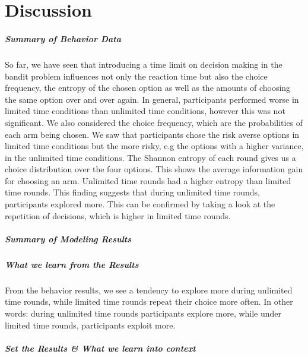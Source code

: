 
\chapter{Discussion}\label{ch:discussion}
\paragraph{Summary of Behavior Data}
So far, we have seen that introducing a time limit on decision making in the bandit problem influences not only the reaction time but also the choice frequency, the entropy of the chosen option as well as the amounts of choosing the same option over and over again. 
In general, participants performed worse in limited time conditions than unlimited time conditions, however this was not significant. 
We also considered the choice frequency, which are the probabilities of each arm being chosen. We saw that participants chose the risk averse options in limited time conditions but the more risky, e.g the options with a higher variance, in the unlimited time conditions.
The Shannon entropy of each round gives us a choice distribution over the four options. This shows the average information gain for choosing an arm. Unlimited time rounds had a higher entropy than limited time rounds. This finding suggests that during unlimited time rounds, participants explored more. 
This can be confirmed by taking a look at the repetition of decisions, which is higher in limited time rounds. 

\paragraph{Summary of Modeling Results}
\paragraph{What we learn from the Results}
From the behavior results, we see a tendency to explore more during unlimited time rounds, while limited time rounds repeat their choice more often. In other words: during unlimited time rounds participants explore more, while under limited time rounds, participants exploit more.  
\paragraph{Set the Results & What we learn into context}
